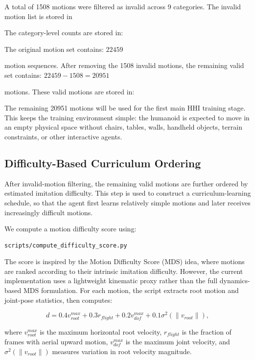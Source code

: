 \documentclass[11pt,a4paper]{article}
\begin{document}
A total of 1508 motions were filtered as invalid across 9 categories. The invalid motion list is stored in 

The category-level counts are stored in: 

The original motion set contains: $22459$

motion sequences. After removing the 1508 invalid motions, the remaining valid set contains: $22459 - 1508 = 20951$

motions. These valid motions are stored in: 

The remaining 20951 motions will be used for the first main HHI training stage. This keeps the training environment simple: the humanoid is expected to move in an empty physical space without chairs, tables, walls, handheld objects, terrain constraints, or other interactive agents.

\subsection{Difficulty-Based Curriculum Ordering}

After invalid-motion filtering, the remaining valid motions are further ordered by estimated imitation difficulty.
This step is used to construct a curriculum-learning schedule, so that the agent first learns relatively simple motions and later receives increasingly difficult motions.

We compute a motion difficulty score using:

\begin{lstlisting}
scripts/compute_difficulty_score.py
\end{lstlisting}

The score is inspired by the Motion Difficulty Score (MDS) idea, where motions are ranked according to their intrinsic imitation difficulty.
However, the current implementation uses a lightweight kinematic proxy rather than the full dynamics-based MDS formulation.
For each motion, the script extracts root motion and joint-pose statistics, then computes:

\begin{equation}
    d =
    0.4 v^{max}_{root}
    + 0.3 r_{flight}
    + 0.2 v^{max}_{dof}
    + 0.1 \sigma^2(\|v_{root}\|),
\end{equation}

where $v^{max}_{root}$ is the maximum horizontal root velocity, $r_{flight}$ is the fraction of frames with aerial upward motion, $v^{max}_{dof}$ is the maximum joint velocity, and $\sigma^2(\|v_{root}\|)$ measures variation in root velocity magnitude.
\end{document}
